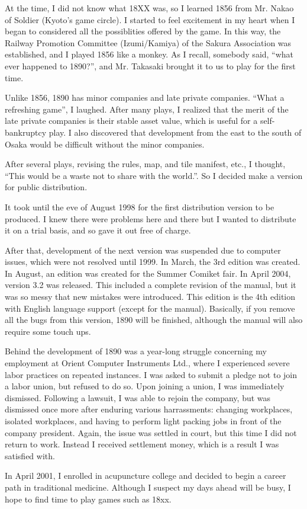 \begin{multicols}{2}
At the time, I did not know what 18XX was, so I learned 1856 from
Mr. Nakao of Soldier (Kyoto's game circle). I started to feel
excitement in my heart when I began to considered all the possiblities
offered by the game. In this way, the Railway Promotion Committee
(Izumi/Kamiya) of the Sakura Association was established, and I played
1856 like a monkey. As I recall, somebody said, ``what ever happened
to 1890?'', and Mr. Takasaki brought it to us to play for the first time.

Unlike 1856, 1890 has minor companies and late private
companies. ``What a refreshing game'', I laughed. After many plays, I
realized that the merit of the late private companies is their stable
asset value, which is useful for a self-bankruptcy play. I also
discovered that development from the east to the south of Osaka would
be difficult without the minor companies.

After several plays, revising the rules, map, and tile manifest, etc.,
I thought, ``This would be a waste not to share with the world.''. So
I decided make a version for public distribution.

It took until the eve of August 1998 for the first distribution
version to be produced. I knew there were problems here and there but
I wanted to distribute it on a trial basis, and so gave it out free
of charge.

After that, development of the next version was suspended due to
computer issues, which were not resolved until 1999. In March, the 3rd
edition was created. In August, an edition was created for the Summer
Comiket fair. In April 2004, version 3.2 was released. This included a
complete revision of the manual, but it was so messy that new mistakes
were introduced. This edition is the 4th edition with English language
support (except for the manual). Basically, if you remove all the bugs
from this version, 1890 will be finished, although the manual will
also require some touch ups.

Behind the development of 1890 was a year-long struggle concerning my
employment at Orient Computer Instruments Ltd., where I experienced
severe labor practices on repeated instances. I was asked to submit a
pledge not to join a labor union, but refused to do so. Upon joining a
union, I was immediately dismissed. Following a lawsuit, I was able to
rejoin the company, but was dismissed once more after enduring various
harrassments: changing workplaces, isolated workplaces, and having to
perform light packing jobs in front of the company president. Again,
the issue was settled in court, but this time I did not return to
work.  Instead I received settlement money, which is a result I was
satisfied with.

In April 2001, I enrolled in acupuncture college and decided to begin
a career path in traditional medicine. Although I suspect my days
ahead will be busy, I hope to find time to play games such as 18xx.
\end{multicols}

